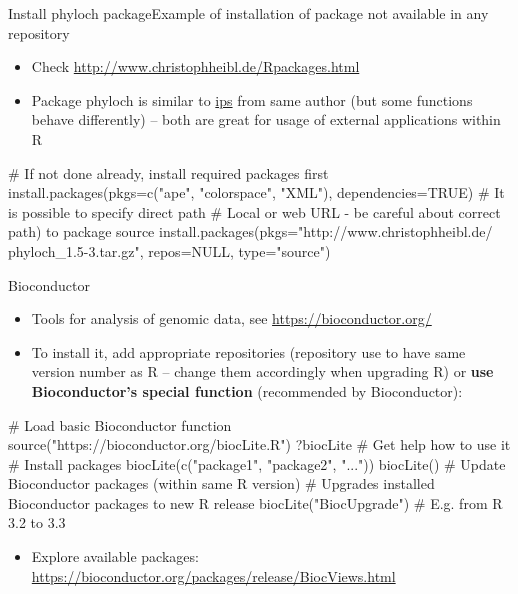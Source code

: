 \documentclass[compress, ucs, xelatex, 11pt, xcolor=svgnames,
  hyperref={
    bookmarks=true,
    unicode=true,
    colorlinks=true,
    pdftitle={Molecular data in R},
    plainpages=false,
    pdfauthor={Vojtech Zeisek},
    pdfsubject={Course about phylogeny and evolution in R},
    pdfcreator={XeLaTeX},
    pdfkeywords={R, evolution, phylogeny, molecular data},
    linkcolor=Tomato,
    anchorcolor=SaddleBrown,
    citecolor=Goldenrod,
    filecolor=DarkMagenta,
    menucolor=Sienna,
    urlcolor=DarkTurquoise,
    pdftex},
  url={hyphens, lowtilde} %
  ]{beamer}
\begin{document}
\begin{frame}[fragile]{Install phyloch package}{Example of installation of package not available in any repository}
  \label{phyloch}
  \begin{itemize}
    \item Check \url{http://www.christophheibl.de/Rpackages.html} 
    \item Package phyloch is similar to \href{https://cran.r-project.org/web/packages/ips/}{ips} from same author (but some functions behave differently) -- both are great for usage of external applications within R
  \end{itemize}
  \begin{spluscode}
    # If not done already, install required packages first
    install.packages(pkgs=c("ape", "colorspace", "XML"),
      dependencies=TRUE)
    # It is possible to specify direct path
    # Local or web URL - be careful about correct path) to package source
    install.packages(pkgs="http://www.christophheibl.de/
      phyloch_1.5-3.tar.gz", repos=NULL, type="source")
  \end{spluscode}
\end{frame}

\begin{frame}[fragile]{Bioconductor}
  \label{bioc}
  \begin{itemize}
    \item Tools for analysis of genomic data, see \url{https://bioconductor.org/}
    \item To install it, add appropriate repositories (repository use to have same version number as R -- change them accordingly when upgrading R) or \textbf{use Bioconductor's special function} (recommended by Bioconductor):
  \end{itemize}
  \begin{spluscode}
    # Load basic Bioconductor function
    source("https://bioconductor.org/biocLite.R")
    ?biocLite # Get help how to use it
    # Install packages
    biocLite(c("package1", "package2", "..."))
    biocLite() # Update Bioconductor packages (within same R version)
    # Upgrades installed Bioconductor packages to new R release
    biocLite("BiocUpgrade") # E.g. from R 3.2 to 3.3
  \end{spluscode}
  \begin{itemize}
    \item Explore available packages: \url{https://bioconductor.org/packages/release/BiocViews.html}
  \end{itemize}
\end{frame}
\end{document}
